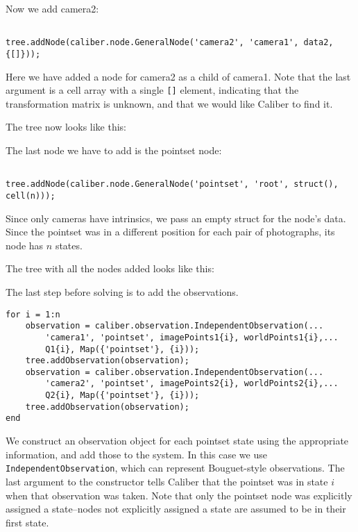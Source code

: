 Now we add camera2:

\begin{verbatim}

tree.addNode(caliber.node.GeneralNode('camera2', 'camera1', data2, {[]}));
\end{verbatim}

Here we have added a node for camera2 as a child of camera1. 
Note that the last
argument is a cell array with a single \texttt{[]} element, 
indicating that the transformation matrix is unknown, 
and that we would
like Caliber to find it. 

The tree now looks like this:

\centerline{}

The last node we have to add is the pointset node:

\begin{verbatim}

tree.addNode(caliber.node.GeneralNode('pointset', 'root', struct(), cell(n)));
\end{verbatim}

Since only cameras have intrinsics, we pass an empty struct for the node's data.
Since the pointset was in a different position for each pair of photographs, its node has $n$ states.

The tree with all the nodes added looks like this:

\centerline{}

The last step before solving is to add the observations.

\begin{verbatim}
for i = 1:n
    observation = caliber.observation.IndependentObservation(...
        'camera1', 'pointset', imagePoints1{i}, worldPoints1{i},...
        Q1{i}, Map({'pointset'}, {i}));
    tree.addObservation(observation);
    observation = caliber.observation.IndependentObservation(...
        'camera2', 'pointset', imagePoints2{i}, worldPoints2{i},...
        Q2{i}, Map({'pointset'}, {i}));
    tree.addObservation(observation);
end
\end{verbatim}

We construct an observation object for each pointset state using the appropriate information,
and add those to the system. 
In this case we use \texttt{IndependentObservation}, which can represent Bouguet-style observations.
The last argument to the constructor tells Caliber that the pointset was
in state $i$ when that observation was taken. Note that only the pointset node was explicitly assigned
a state--nodes not explicitly assigned a state are assumed to be in their first state.

